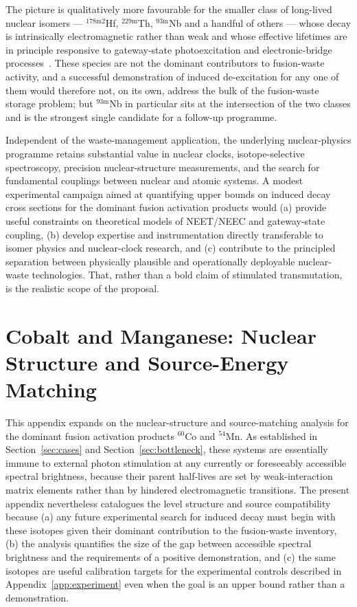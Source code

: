 \documentclass[conference]{IEEEtran}
\begin{document}
The picture is qualitatively more favourable for the smaller class of long-lived nuclear isomers --- $^{178\mathrm{m}2}$Hf, $^{229\mathrm{m}}$Th, $^{93\mathrm{m}}$Nb and a handful of others --- whose decay is intrinsically electromagnetic rather than weak and whose effective lifetimes are in principle responsive to gateway-state photoexcitation and electronic-bridge processes~\cite{walker1999nature,walker2020isomers,karpeshin2006induced,palffy2007neec}. These species are not the dominant contributors to fusion-waste activity, and a successful demonstration of induced de-excitation for any one of them would therefore not, on its own, address the bulk of the fusion-waste storage problem; but $^{93\mathrm{m}}$Nb in particular sits at the intersection of the two classes and is the strongest single candidate for a follow-up programme.

Independent of the waste-management application, the underlying nuclear-physics programme retains substantial value in nuclear clocks, isotope-selective spectroscopy, precision nuclear-structure measurements, and the search for fundamental couplings between nuclear and atomic systems. A modest experimental campaign aimed at quantifying upper bounds on induced decay cross sections for the dominant fusion activation products would (a) provide useful constraints on theoretical models of NEET/NEEC and gateway-state coupling, (b) develop expertise and instrumentation directly transferable to isomer physics and nuclear-clock research, and (c) contribute to the principled separation between physically plausible and operationally deployable nuclear-waste technologies. That, rather than a bold claim of stimulated transmutation, is the realistic scope of the proposal.

\appendices
\section{Cobalt and Manganese: Nuclear Structure and Source-Energy Matching}
\label{app:co-mn}

This appendix expands on the nuclear-structure and source-matching analysis for the dominant fusion activation products $^{60}$Co and $^{54}$Mn. As established in Section~\ref{sec:cases} and Section~\ref{sec:bottleneck}, these systems are essentially immune to external photon stimulation at any currently or foreseeably accessible spectral brightness, because their parent half-lives are set by weak-interaction matrix elements rather than by hindered electromagnetic transitions. The present appendix nevertheless catalogues the level structure and source compatibility because (a) any future experimental search for induced decay must begin with these isotopes given their dominant contribution to the fusion-waste inventory, (b) the analysis quantifies the size of the gap between accessible spectral brightness and the requirements of a positive demonstration, and (c) the same isotopes are useful calibration targets for the experimental controls described in Appendix~\ref{app:experiment} even when the goal is an upper bound rather than a demonstration.
\end{document}
